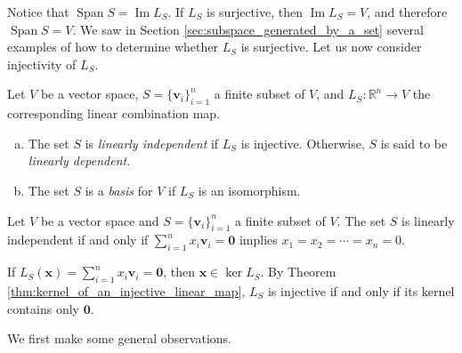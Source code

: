 \documentclass[12pt,letterpaper,reqno]{article}
\numberwithin{equation}{section}
\newcommand{\R}{\ensuremath{\mathbb R}}
\DeclareMathOperator{\im}{Im}
\DeclareMathOperator{\Span}{Span}
\begin{document}
Notice that $\Span S=\im L_S$. If $L_S$ is surjective, then $\im L_S=V$, and therefore $\Span S=V$. We saw in Section \ref{sec:subspace_generated_by_a_set} several examples of how to determine whether $L_S$ is surjective. Let us now consider injectivity of $L_S$.

\begin{defn}\label{def:linearly_independent_sets_and_bases}
	Let $V$ be a vector space, $S=\{\mathbf{v}_i\}_{i=1}^n$ a finite subset of $V$, and $L_S:\R^n \to V$ the corresponding linear combination map. 
	\begin{enumerate}[(a)]
		\item The set $S$ is \emph{linearly independent} if $L_S$ is injective. Otherwise, $S$ is said to be \emph{linearly dependent}.
		\item The set $S$ is a \emph{basis} for $V$ if $L_S$ is an isomorphism.
	\end{enumerate}
\end{defn}

\begin{prop}
Let $V$ be a vector space and $S=\{\mathbf{v}_i\}_{i=1}^n$ a finite subset of $V$. The set $S$ is linearly independent if and only if $\sum_{i=1}^nx_i\mathbf{v}_i=\mathbf{0}$ implies $x_1=x_2=\cdots=x_n=0$. 
\end{prop}

\begin{pf}
If $L_S(\mathbf{x})=\sum_{i=1}^nx_i\mathbf{v}_i=\mathbf{0}$, then $\mathbf{x} \in \ker L_S$. By Theorem \ref{thm:kernel_of_an_injective_linear_map}, $L_S$ is injective if and only if its kernel contains only $\mathbf{0}$.
\end{pf}

We first make some general observations.
\end{document}
